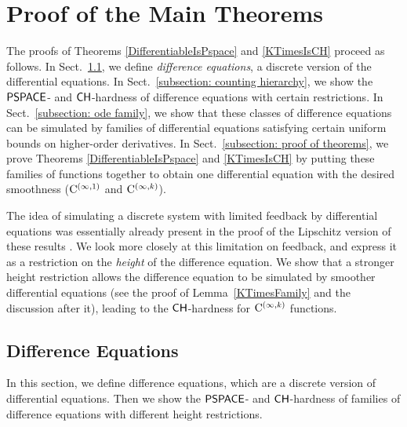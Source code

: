 \section{Proof of the Main Theorems}
\label{section:differentiable}

The proofs of Theorems \ref{DifferentiableIsPspace} and \ref{KTimesIsCH}
proceed as follows. 
In Sect.~\ref{section:divp}, 
we define \emph{difference equations}, 
a discrete version of the differential equations. 
In Sect.~\ref{subsection: counting hierarchy}, 
we show the $\mathsf{PSPACE}$- and $\mathsf{CH}$-hardness of 
difference equations with certain restrictions. 
In Sect.~\ref{subsection: ode family}, 
we show that these classes of difference equations can be simulated
by families of differential equations 
satisfying certain uniform bounds on higher-order derivatives. 
In Sect.~\ref{subsection: proof of theorems}, 
we prove Theorems \ref{DifferentiableIsPspace} and \ref{KTimesIsCH} by
putting these families of functions together 
to obtain one differential equation 
with the desired smoothness 
($\mathrm C ^{(\infty, 1)}$ and $\mathrm C ^{(\infty, k)}$). 

The idea of simulating a discrete system with limited feedback 
by differential equations
was essentially already present in the proof of 
the Lipschitz version of these results \cite{kawamura2010lipschitz}. 
We look more closely at this limitation on feedback, 
and express it as a restriction on the \emph{height}
of the difference equation. 
We show that a stronger height restriction allows
the difference equation to be simulated by 
smoother differential equations 
(see the proof of Lemma~\ref{KTimesFamily} and the discussion after it), 
leading to the $\mathsf{CH}$-hardness for $\mathrm C ^{(\infty, k)}$ functions.

\subsection{Difference Equations}
\label{section:divp}

In this section, we define difference equations, 
which are a discrete version of differential equations. 
Then we show the $\mathsf{PSPACE}$- and $\mathsf{CH}$-hardness of 
families of difference equations with different height restrictions. 

